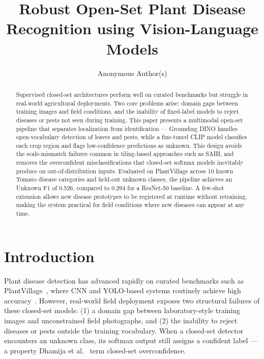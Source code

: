 \documentclass[runningheads]{llncs}
\begin{document}
\title{Robust Open-Set Plant Disease Recognition using Vision-Language Models}

\author{Anonymous Author(s)}


\maketitle

\begin{abstract}
Supervised closed-set architectures perform well on curated benchmarks but struggle in real-world agricultural deployments. Two core problems arise: domain gaps between training images and field conditions, and the inability of fixed-label models to reject diseases or pests not seen during training. This paper presents a multimodal open-set pipeline that separates localization from identification --- Grounding DINO handles open-vocabulary detection of leaves and pests, while a fine-tuned CLIP model classifies each crop region and flags low-confidence predictions as unknown. This design avoids the scale-mismatch failures common in tiling-based approaches such as SAHI, and removes the overconfident misclassifications that closed-set softmax models inevitably produce on out-of-distribution inputs. Evaluated on PlantVillage across 10 known Tomato disease categories and held-out unknown classes, the pipeline achieves an Unknown F1 of 0.526, compared to 0.294 for a ResNet-50 baseline. A few-shot extension allows new disease prototypes to be registered at runtime without retraining, making the system practical for field conditions where new diseases can appear at any time.

\end{abstract}

\section{Introduction}
Plant disease detection has advanced rapidly on curated benchmarks such as PlantVillage~\cite{hughes2015open}, where CNN and YOLO-based systems routinely achieve high accuracy~\cite{mohanty2016using, ferentinos2018deep}. However, real-world field deployment exposes two structural failures of these closed-set models: (1) a domain gap between laboratory-style training images and unconstrained field photographs, and (2) the inability to reject diseases or pests outside the training vocabulary. When a closed-set detector encounters an unknown class, its softmax output still assigns a confident label --- a property Dhamija et al.~\cite{dhamija2020overlooked} term closed-set overconfidence.
\end{document}
